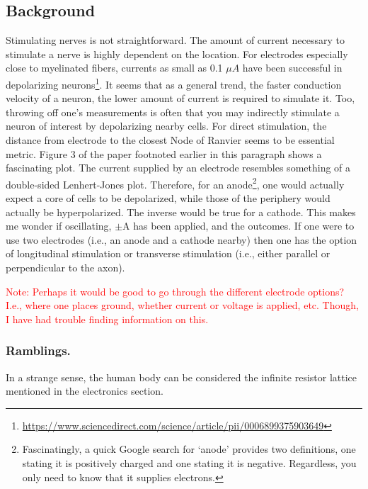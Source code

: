 \documentclass[12pt]{report}
\begin{document}
\subsection{Background}
Stimulating nerves is not straightforward. The amount of current necessary to stimulate a nerve is highly dependent on the location. For electrodes especially close to myelinated fibers, currents as small as 0.1 $\mu A$ have been successful in depolarizing neurons\footnote{\url{https://www.sciencedirect.com/science/article/pii/0006899375903649}}. It seems that as a general trend, the faster conduction velocity of a neuron, the lower amount of current is required to simulate it. Too, throwing off one's measurements is often that you may indirectly stimulate a neuron of interest by depolarizing nearby cells. For direct stimulation, the distance from electrode to the closest Node of Ranvier seems to be essential metric. Figure 3 of the paper footnoted earlier in this paragraph shows a fascinating plot. The current supplied by an electrode resembles something of a double-sided Lenhert-Jones plot. Therefore, for an anode\footnote{Fascinatingly, a quick Google search for `anode' provides two definitions, one stating it is positively charged and one stating it is negative. Regardless, you only need to know that it supplies electrons.}, one would actually expect a core of cells to be depolarized, while those of the periphery would actually be hyperpolarized. The inverse would be true for a cathode. This makes me wonder if oscillating, $\pm$A has been applied, and the outcomes. If one were to use two electrodes (i.e., an anode and a cathode nearby) then one has the option of longitudinal stimulation or transverse stimulation (i.e., either parallel or perpendicular to the axon).\newline

\textcolor{red}{Note: Perhaps it would be good to go through the different electrode options? I.e., where one places ground, whether current or voltage is applied, etc. Though, I have had trouble finding information on this.}

\subsubsection{Ramblings.}
In a strange sense, the human body can be considered the infinite resistor lattice mentioned in the electronics section. 
\end{document}
